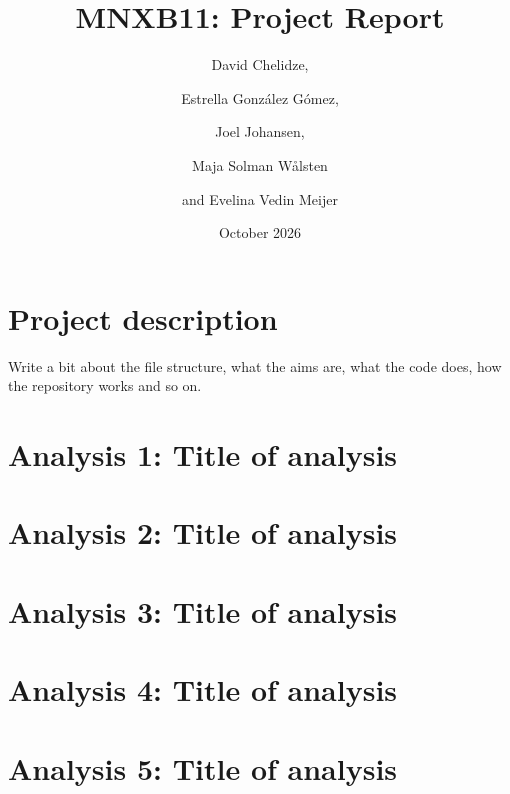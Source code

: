 \documentclass{article}[12pt]
\title{\vspace{-2cm}
MNXB11: Project Report}
\author{
David Chelidze, \and 
Estrella González Gómez, \and
Joel Johansen, \and
Maja Solman Wålsten \and 
and Evelina Vedin Meijer
}
\date{October 2026}
\begin{document}
\maketitle

\section{Project description}
Write a bit about the file structure, what the aims are, what the code does, how the repository works and so on. 

\section{Analysis 1: Title of analysis}
\section{Analysis 2: Title of analysis}
\section{Analysis 3: Title of analysis}
\section{Analysis 4: Title of analysis}
\section{Analysis 5: Title of analysis}
\end{document}
